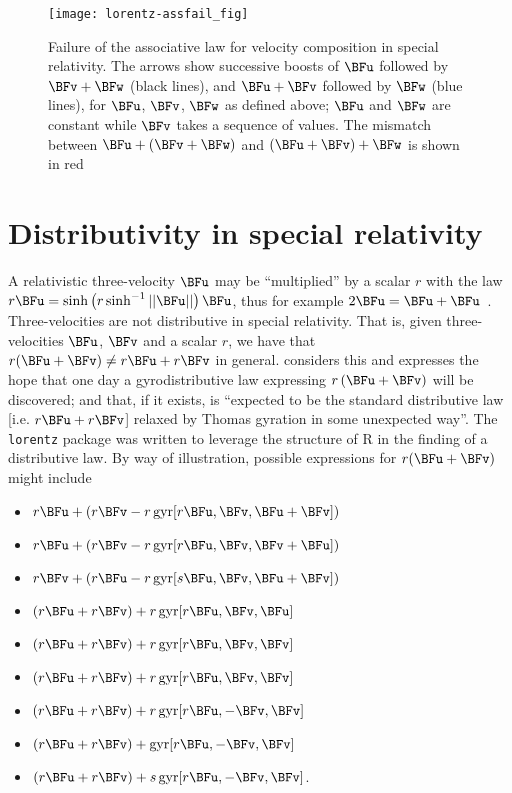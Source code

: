 \documentclass[ijoc,nonblindrev]{informs3} %
\begin{document}
\begin{figure}[htbp]
  \begin{center}
\texttt{[image: lorentz-assfail\_fig]}
\caption{Failure of the associative law \label{assfail} for velocity
  composition in special relativity.  The arrows show successive
  boosts of $\BFu$ followed by $\BFv+\BFw$ (black lines), and $\BFu+\BFv$
  followed by $\BFw$ (blue lines), for $\BFu$, $\BFv$, $\BFw$ as defined
  above; $\BFu$ and $\BFw$ are constant while $\BFv$ takes a sequence of
  values. The mismatch between $\BFu+\left(\BFv+\BFw\right)$ and
  $\left(\BFu+\BFv\right)+\BFw$ is shown in red}
  \end{center}
\end{figure}


\section{Distributivity in special relativity}

A relativistic three-velocity $\BFu$ may be ``multiplied'' by a scalar
$r$ with the law
$r\BFu=\sinh\left(r\sinh^{-1}\left|\left|\BFu\right|\right|\right)\BFu$,
thus for example $2\BFu=\BFu+\BFu$~\citep{ungar1997}.  Three-velocities
are not distributive in special relativity.  That is, given
three-velocities $\BFu$, $\BFv$ and a scalar $r$, we have that
$r(\BFu+\BFv)\neq r\BFu+r\BFv$ in general.  \cite{ungar1997} considers
this and expresses the hope that one day a gyrodistributive law
expressing $r\left(\BFu+\BFv\right)$ will be discovered; and that, if it
exists, is ``expected to be the standard distributive law
[i.e. $r\BFu+r\BFv$] relaxed by Thomas gyration in some unexpected
way''.  The {\tt lorentz} package was written to leverage the
structure of R in the finding of a distributive law.  By way of
illustration, possible expressions for $r(\BFu+\BFv)$ might include

\begin{itemize}
\item $r\BFu  + (r\BFv  - r\operatorname{gyr}[r\BFu, \BFv,\BFu+\BFv])$
\item $r\BFu  + (r\BFv  - r\operatorname{gyr}[r\BFu, \BFv,\BFv+\BFu])$
\item $r\BFv  + (r\BFu  - r\operatorname{gyr}[s\BFu, \BFv,\BFu+\BFv])$
\item $(r\BFu + r\BFv)  + r\operatorname{gyr}[r\BFu, \BFv,\BFu]$
\item $(r\BFu + r\BFv)  + r\operatorname{gyr}[r\BFu, \BFv,\BFv]$
\item $(r\BFu + r\BFv)  + r\operatorname{gyr}[r\BFu, \BFv,\BFv]$
\item $(r\BFu + r\BFv)  + r\operatorname{gyr}[r\BFu,-\BFv,\BFv]$
\item $(r\BFu + r\BFv)  +   \operatorname{gyr}[r\BFu,-\BFv,\BFv]$
\item $(r\BFu + r\BFv)  + s\operatorname{gyr}[r\BFu,-\BFv,\BFv]$.
\end{itemize}
\end{document}
